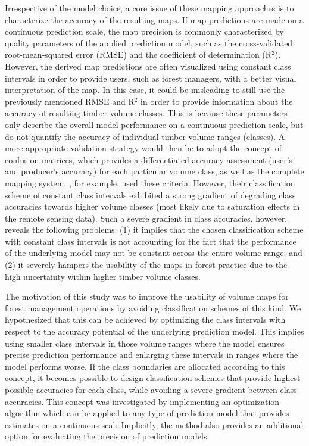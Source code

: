 Irrespective of the model choice, a core issue of these mapping approaches is to characterize the accuracy of the resulting maps. If map predictions are made on a continuous prediction scale, the map precision is commonly characterized by quality parameters of the applied prediction model, such as the cross-validated root-mean-squared error (RMSE) and the coefficient of determination (R$^2$). However, the derived map predictions are often visualized using constant class intervals in order to provide users, such as forest managers, with a better visual interpretation of the map. In this case, it could be misleading to still use the previously mentioned RMSE and R$^2$ in order to provide information about the accuracy of resulting timber volume classes. This is because these parameters only describe the overall model performance on a continuous prediction scale, but do not quantify the accuracy of individual timber volume ranges (classes). A more appropriate validation strategy would then be to adopt the concept of confusion matrices, which provides a differentiated accuracy assessment (user's and producer's accuracy) for each particular volume class, as well as the complete mapping system. \citet{franco2001}, for example, used these criteria. However, their classification scheme of constant class intervals exhibited a strong gradient of degrading class accuracies towards higher volume classes (most likely due to saturation effects in the remote sensing data). Such a severe gradient in class accuracies, however, reveals the following problems: (1) it implies that the chosen classification scheme with constant class intervals is not accounting for the fact that the performance of the underlying model may not be constant across the entire volume range; and (2) it severely hampers the usability of the maps in forest practice due to the high uncertainty within higher timber volume classes.\par
The motivation of this study was to improve the usability of volume maps for forest management operations by avoiding classification schemes of this kind. We hypothesized that this can be achieved by optimizing the class intervals with respect to the accuracy potential of the underlying prediction model. This implies using smaller class intervals in those volume ranges where the model ensures precise prediction performance and enlarging these intervals in ranges where the model performs worse. If the class boundaries are allocated according to this concept, it becomes possible to design classification schemes that provide highest possible accuracies for each class, while avoiding a severe gradient between class accuracies. This concept was investigated by implementing an optimization algorithm which can be applied to any type of prediction model that provides estimates on a continuous scale.Implicitly,   the   method   also   provides   an   additional   option   for   evaluating   the   precision   of prediction models.\par
